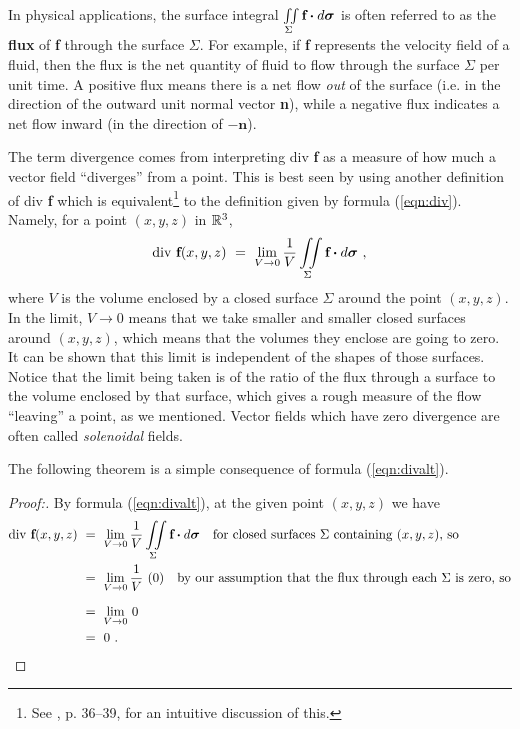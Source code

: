 In physical applications, the surface integral $\iint\limits_{\Sigma} \textbf{f} \bm{\cdot} d\bm{\sigma}$ is often
referred to as the \textbf{flux} of \textbf{f} through the surface $\Sigma$. For example, if \textbf{f}
represents the velocity field of a fluid, then the flux
is the net quantity of fluid to flow through the surface $\Sigma$ per unit time. A
positive flux means there is a net flow \emph{out} of the surface (i.e. in the direction of the outward
unit normal vector \textbf{n}), while a negative flux indicates a net flow inward (in the direction of
$-\textbf{n}$).

The term divergence comes from interpreting div \textbf{f} as a measure of how much a vector field ``diverges''
from a point. This is best seen by using another definition of div \textbf{f} which is
equivalent\footnote{See \cite{sch}, p. 36--39, for an intuitive discussion of this.} to the definition given by
formula (\ref{eqn:div}). Namely, for a point $(x,y,z)$ in $\mathbb{R}^{3}$,
\begin{equation}\label{eqn:divalt}
 \text{div}~\textbf{f}(x,y,z) ~=~ \lim_{V \to 0} \frac{1}{V} \iint\limits_{\Sigma} \textbf{f} \bm{\cdot} d\bm{\sigma} ~,
\end{equation}
where $V$ is the volume enclosed by a closed surface $\Sigma$ around the point $(x,y,z)$. In the limit, $V \to 0$ means
that we take smaller and smaller closed surfaces around $(x,y,z)$, which means that the volumes they enclose are going
to zero. It can be shown that this limit is independent of the shapes of those surfaces. Notice that the limit being
taken is of the ratio of the flux through a surface to the volume enclosed by that surface, which gives a rough
measure of the flow ``leaving'' a point, as we mentioned. Vector fields which have zero divergence are
often called \emph{solenoidal} fields.

The following theorem is a simple consequence of formula (\ref{eqn:divalt}).

\begin{proofbar}\vspace{-3mm}\begin{proof}[Proof:]
 By formula (\ref{eqn:divalt}), at the given point $(x,y,z)$ we have 
 \begin{align*}
  \text{div}~\textbf{f}(x,y,z) ~&=~ \lim_{V \to 0} \frac{1}{V} \iint\limits_{\Sigma} \Dotprod{\textbf{f}}{d\bm{\sigma}}
   ~~~\text{for closed surfaces $\Sigma$ containing $(x,y,z)$, so}\\
    &=~ \lim_{V \to 0} \frac{1}{V} \,\, (0) ~~~\text{by our assumption that the flux through each $\Sigma$ is
    zero, so}\\[6pt]
    &=~ \lim_{V \to 0} \, 0\\
    &=~ 0 ~.\hfill\qedhere
 \end{align*}
\end{proof}\vspace{-3mm}\end{proofbar}

